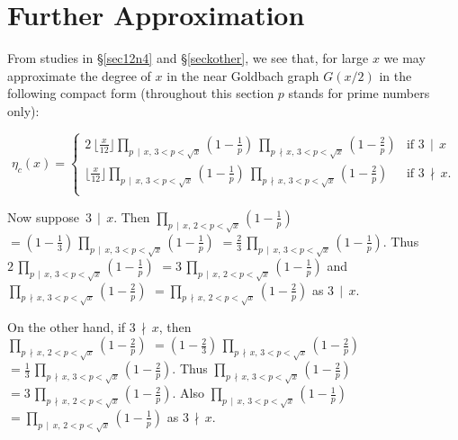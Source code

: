 \documentclass[11pt]{article}
\theoremstyle{definition}
\theoremstyle{remark}
\numberwithin{equation}{section}
\newcommand{\Div}[2]{#1\,\mid\, #2}
\newcommand{\nDiv}[2]{#1\,\nmid\, #2}
\begin{document}
\section{Further Approximation}\label{secfa}

\noindent
From studies in \S \ref{sec12n4} and \S \ref{seckother}, we see that, for large $x$ we may approximate the degree of $x$ in the near Goldbach graph $G(x/2)$ in the following compact form (throughout this section $p$ stands for prime numbers only):

\begin{equation}\label{etacx1}
\eta_c(x) = \left\{%
\begin{array}{rl}
2\,\lfloor\frac{x}{12}\rfloor \prod\limits_{\Div{p}{x},\, 3<p<\sqrt{x}} \left( 1-\frac{1}{p}\right)\ \prod\limits_{\nDiv{p}{x},\, 3<p< \sqrt{x}} \left( 1-\frac{2}{p}\right) & \text{if } \Div{3}{x}\\
\lfloor\frac{x}{12}\rfloor \prod\limits_{\Div{p}{x},\, 3<p<\sqrt{x}} \left( 1-\frac{1}{p}\right)\ \prod\limits_{\nDiv{p}{x},\, 3<p< \sqrt{x}} \left( 1-\frac{2}{p}\right) & \text{if } \nDiv{3}{x}.\\
\end{array}\right.
\end{equation}

\vspace{1em}
\noindent
Now suppose\ $\Div{3}{x}$. Then $\prod\limits_{\Div{p}{x},\, 2<p<\sqrt{x}} \left( 1-\frac{1}{p}\right)$ $= (1-\frac{1}{3})\, \prod\limits_{\Div{p}{x},\, 3<p<\sqrt{x}} \left( 1-\frac{1}{p}\right)$ $=\frac{2}{3}\, \prod\limits_{\Div{p}{x},\, 3<p<\sqrt{x}} \left( 1-\frac{1}{p}\right)$. Thus $2\, \prod\limits_{\Div{p}{x},\, 3<p<\sqrt{x}} \left( 1-\frac{1}{p}\right)$ $=3\, \prod\limits_{\Div{p}{x},\, 2<p<\sqrt{x}} \left( 1-\frac{1}{p}\right)$ and $\prod\limits_{\nDiv{p}{x},\, 3<p< \sqrt{x}} \left( 1-\frac{2}{p}\right)$ $=\prod\limits_{\nDiv{p}{x},\, 2<p< \sqrt{x}} \left( 1-\frac{2}{p}\right)$ as $\Div{3}{x}$.

\vspace{1em}
\noindent
On the other hand, if $\nDiv{3}{x}$, then \\
$\prod\limits_{\nDiv{p}{x},\, 2<p< \sqrt{x}} \left( 1-\frac{2}{p}\right)$ $=(1-\frac{2}{3})\, \prod\limits_{\nDiv{p}{x},\, 3<p< \sqrt{x}} \left( 1-\frac{2}{p}\right)$ $=\frac{1}{3}\, \prod\limits_{\nDiv{p}{x},\, 3<p< \sqrt{x}} \left( 1-\frac{2}{p}\right)$. Thus $\prod\limits_{\nDiv{p}{x},\, 3<p< \sqrt{x}} \left( 1-\frac{2}{p}\right)$ $=3\,\prod\limits_{\nDiv{p}{x},\, 2<p< \sqrt{x}} \left( 1-\frac{2}{p}\right)$. Also $\prod\limits_{\Div{p}{x},\, 3<p<\sqrt{x}} \left( 1-\frac{1}{p}\right)$ $=\prod\limits_{\Div{p}{x},\, 2<p<\sqrt{x}} \left( 1-\frac{1}{p}\right)$ as $\nDiv{3}{x}$.
\end{document}
